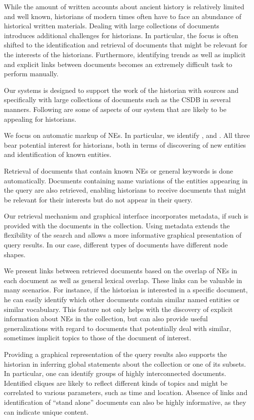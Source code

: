 While the amount of written accounts about ancient history is relatively limited and well known, historians of modern times often have to 
face an abundance of historical written materials. Dealing with large collections of documents introduces additional challenges for historians. 
In particular, the focus is often shifted to the identification and retrieval of documents that might be relevant for the interests of the 
historians. Furthermore, identifying trends as well as implicit and explicit links between documents becomes an extremely difficult task to 
perform manually.

Our systems is designed to support the work of the historian with sources and specifically with large collections of documents such as the 
CSDB in several manners. Following are some of aspects of our system that are likely to be appealing for historians.

We focus on automatic markup of NEs. In particular, we identify ,  and . All three bear potential 
interest for historians, both in terms of discovering of new entities and identification of known entities. 

Retrieval of documents that contain known NEs or general keywords is done automatically. Documents containing name variations of 
the entities appearing in the query are also retrieved, enabling historians to receive documents that might be relevant for their interests 
but do not appear in their query. 

Our retrieval mechanism and graphical interface incorporates metadata, if such is provided with the documents in the collection. 
Using metadata extends the flexibility of the search and allows a more informative graphical presentation of query results. In our case, 
different types of documents have different node shapes. 

We present links between retrieved documents based on the overlap of NEs in each document as well as general lexical overlap. These links can be valuable in many scenarios. 
For instance, if the historian is interested in a specific document, he can easily identify which other documents contain similar named 
entities or similar vocabulary. This feature not only helps with the discovery of explicit information about NEs in the 
collection, but can also provide useful generalizations with regard to documents that potentially deal with similar, sometimes implicit 
topics to those of the document of interest.   

Providing a graphical representation of the query results also supports the historian in inferring global statements about the collection or 
one of its subsets. In particular, one can identify groups of highly interconnected documents. Identified cliques are likely to reflect 
different kinds of topics and might be correlated to various parameters, such as time and location. Absence of links and identification of 
``stand alone'' documents can also be highly informative, as they can indicate unique content. 

